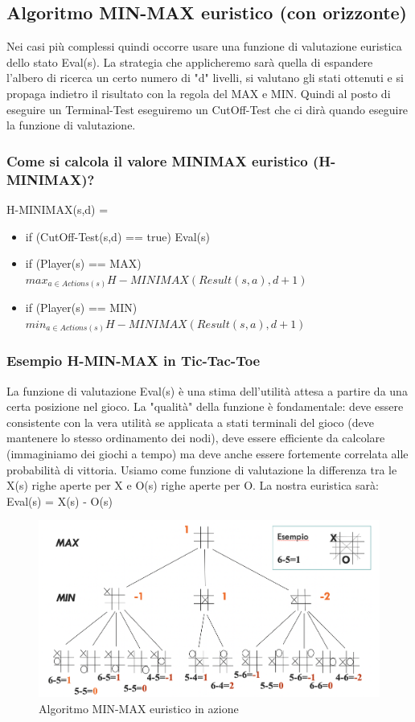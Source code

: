 \documentclass{article}
\begin{document}
\subsection{Algoritmo MIN-MAX euristico (con orizzonte)}
Nei casi più complessi quindi occorre usare una funzione di valutazione euristica dello stato Eval(s). La strategia che applicheremo sarà quella di espandere l'albero di ricerca un certo numero di "d" livelli, si valutano gli stati ottenuti e si propaga indietro il risultato con la regola del MAX e MIN. Quindi al posto di eseguire un Terminal-Test eseguiremo un CutOff-Test che ci dirà quando eseguire la funzione di valutazione.

\subsubsection{Come si calcola il valore MINIMAX euristico (H-MINIMAX)?}
H-MINIMAX(s,d) =
\begin{itemize}
    \item if (CutOff-Test(s,d) == true) Eval(s)
    \item if (Player(s) == MAX) $max_{a \in Actions(s)}H-MINIMAX(Result(s,a), d+1)$
    \item if (Player(s) == MIN) $min_{a \in Actions(s)}H-MINIMAX(Result(s,a), d+1)$
\end{itemize}

\subsubsection{Esempio H-MIN-MAX in Tic-Tac-Toe}
La funzione di valutazione Eval(s) è una stima dell'utilità attesa a partire da una certa posizione nel gioco. La "qualità" della funzione è fondamentale: deve essere consistente con la vera utilità se applicata a stati terminali del gioco (deve mantenere lo stesso ordinamento dei nodi), deve essere efficiente da calcolare (immaginiamo dei giochi a tempo) ma deve anche essere fortemente correlata alle probabilità di vittoria. \newline 
Usiamo come funzione di valutazione la differenza tra le X(s) righe aperte per X e O(s) righe aperte per O. La nostra euristica sarà: Eval(s) = X(s) - O(s)
\begin{figure}[H]
\centering
\includegraphics[scale=0.4]{Images/minmaxeuristico.png}
\caption{Algoritmo MIN-MAX euristico in azione}
\end{figure}
\end{document}
